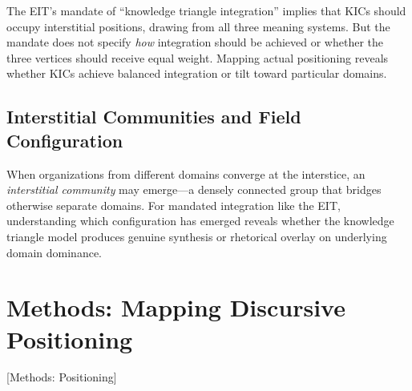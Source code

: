 \documentclass[../main.tex]{subfiles}
\begin{document}
The EIT's mandate of ``knowledge triangle integration'' implies that KICs should occupy interstitial positions, drawing from all three meaning systems. But the mandate does not specify \textit{how} integration should be achieved or whether the three vertices should receive equal weight. Mapping actual positioning reveals whether KICs achieve balanced integration or tilt toward particular domains.

\subsection{Interstitial Communities and Field Configuration}

When organizations from different domains converge at the interstice, an \textit{interstitial community} may emerge---a densely connected group that bridges otherwise separate domains. For mandated integration like the EIT, understanding which configuration has emerged reveals whether the knowledge triangle model produces genuine synthesis or rhetorical overlay on underlying domain dominance.


\section{Methods: Mapping Discursive Positioning}[Methods: Positioning]
\end{document}
